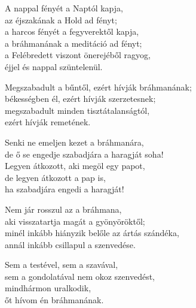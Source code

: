 \begin{dhpverse}

 A nappal fényét a Naptól kapja,\\
az éjszakának a Hold ad fényt;\\
a harcos fényét a fegyverektől kapja,\\
a bráhmanának a meditáció ad fényt;\\
a Felébredett viszont önerejéből ragyog,\\
éjjel és nappal szüntelenül.

 Megszabadult a bűntől, ezért hívják bráhmanának;\\
békességben él, ezért hívják szerzetesnek;\\
megszabadult minden tisztátalanságtól,\\
ezért hívják remetének.

 Senki ne emeljen kezet a bráhmanára,\\
de ő se engedje szabadjára a haragját soha!\\
Legyen átkozott, aki megöl egy papot,\\
de legyen átkozott a pap is,\\
ha szabadjára engedi a haragját!

 Nem jár rosszul az a bráhmana,\\
aki visszatartja magát a gyönyöröktől;\\
minél inkább hiányzik belőle az ártás szándéka,\\
annál inkább csillapul a szenvedése.

 Sem a testével, sem a szavával,\\
sem a gondolatával nem okoz szenvedést,\\
mindhármon uralkodik,\\
őt hívom én bráhmanának.

\end{dhpverse}
\newpage
